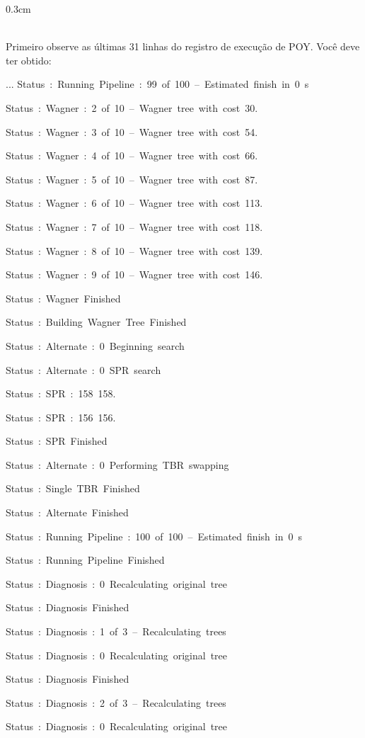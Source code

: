 \begin{refsection}
\begin {myindentpar}{0.3cm}
\begin{enumerate}[\itshape i.]
\\

Primeiro observe as últimas 31 linhas do registro de execução de POY. Você deve ter obtido:

\scriptsize

...
Status~:~Running~Pipeline~:~99~of~100~--~Estimated~finish~in~0~s

Status~:~Wagner~:~2~of~10~--~Wagner~tree~with~cost~30.

Status~:~Wagner~:~3~of~10~--~Wagner~tree~with~cost~54.

Status~:~Wagner~:~4~of~10~--~Wagner~tree~with~cost~66.

Status~:~Wagner~:~5~of~10~--~Wagner~tree~with~cost~87.

Status~:~Wagner~:~6~of~10~--~Wagner~tree~with~cost~113.

Status~:~Wagner~:~7~of~10~--~Wagner~tree~with~cost~118.

Status~:~Wagner~:~8~of~10~--~Wagner~tree~with~cost~139.

Status~:~Wagner~:~9~of~10~--~Wagner~tree~with~cost~146.

Status~:~Wagner~Finished

Status~:~Building~Wagner~Tree~Finished

Status~:~Alternate~:~0~Beginning~search

Status~:~Alternate~:~0~SPR~search

Status~:~SPR~:~158~158.

Status~:~SPR~:~156~156.

Status~:~SPR~Finished

Status~:~Alternate~:~0~Performing~TBR~swapping

Status~:~Single~TBR~Finished

Status~:~Alternate~Finished

Status~:~Running~Pipeline~:~100~of~100~--~Estimated~finish~in~0~s

Status~:~Running~Pipeline~Finished

Status~:~Diagnosis~:~0~Recalculating~original~tree

Status~:~Diagnosis~Finished

Status~:~Diagnosis~:~1~of~3~--~Recalculating~trees

Status~:~Diagnosis~:~0~Recalculating~original~tree

Status~:~Diagnosis~Finished

Status~:~Diagnosis~:~2~of~3~--~Recalculating~trees

Status~:~Diagnosis~:~0~Recalculating~original~tree


\end{enumerate}
\end{myindentpar}
\end{refsection}
